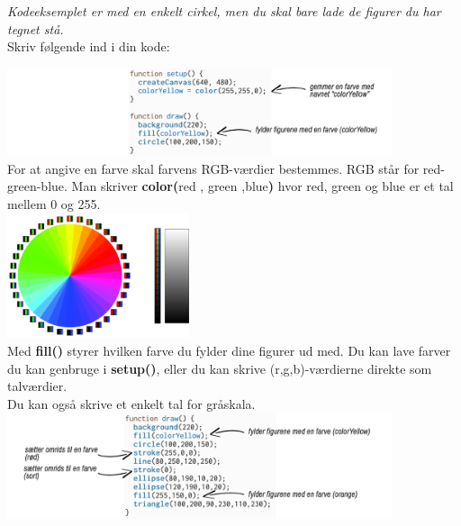 \documentclass{ucph-handout}
\begin{document}
\begin{exercisebox}[adjusted title=Farver]
\textit{Kodeeksemplet er med en enkelt cirkel, men du skal bare lade de figurer du har tegnet stå.}\\
Skriv følgende ind i din kode: 

\vspace{3mm}
\quad\includegraphics[width=0.85\textwidth]{nyebilleder/kodeeksfarver.jpg} \\



For at angive en farve skal farvens RGB-værdier bestemmes. RGB står for red-green-blue. Man skriver \textbf{color(}red , green ,blue\textbf{)} hvor red, green og blue er et tal mellem 0 og 255. \\

\includegraphics[width=0.4\textwidth]{billeder/rgbcolor.jpg} \\

Med \textbf{fill()} styrer hvilken farve du fylder dine figurer ud med. Du kan lave farver du kan genbruge i \textbf{setup()}, eller du kan skrive (r,g,b)-værdierne direkte som talværdier. \\

Du kan også skrive et enkelt tal for gråskala.\\

\quad\quad\includegraphics[width=0.85\textwidth]{nyebilleder/mereefarveeks.jpg} 


\end{exercisebox}
\end{document}
